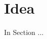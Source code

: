 \chapter{Idea}\label{chap:idea}
\dummy

\begin{chapterorganization}
  \item In Section ...
 
\end{chapterorganization}

